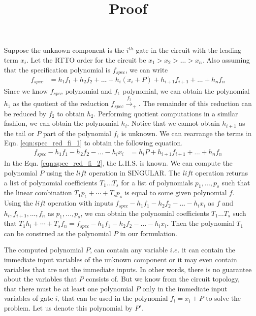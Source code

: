 \documentclass[twocolumn]{IEEEtran}
\theoremstyle{definition}
\begin{document}
\title{Proof} 

\author{}


\thispagestyle{plain}
\pagestyle{plain}

Suppose the unknown component is the $i^{th}$ gate in the circuit with 
the leading term $x_i$. Let the RTTO order for the circuit be $x_1>x_2>\dots>x_n$.
Also assuming that the specification polynomial is $f_{spec}$, we can write
\begin{align}
\label{eqn:spec_red_fi_1}
f_{spec} &= h_1f_1 + h_2f_2 + \dots + h_i(x_i + P) + h_{i+1}f_{i+1} +\dots+ h_nf_n
\end{align}
Since we know $f_{spec}$ polynomial and $f_1$ polynomial, we can obtain the polynomial $h_1$
as the quotient of the reduction $f_{spec} \xrightarrow{f_1}_+$. The remainder of this
reduction can be reduced by $f_2$ to obtain $h_2$. Performing quotient computations in 
a similar fashion, we can obtain the polynomial $h_i$. Notice that we cannot obtain $h_{i+1}$ as the
tail or $P$ part of the polynomial $f_i$ is unknown. We can rearrange the terms in Eqn. \ref{eqn:spec_red_fi_1}
to obtain the following equation.
\begin{align}
\label{eqn:spec_red_fi_2}
f_{spec}-h_1f_1-h_2f_2-\dots-h_ix_i&= h_iP+h_{i+1}f_{i+1} +\dots+ h_nf_n
\end{align}
In the Eqn. \ref{eqn:spec_red_fi_2}, the L.H.S. is known. We can compute the polynomial
$P$ using the $lift$ operation in SINGULAR. The $lift$ operation returns a list of
polynomial coefficients $T_1\dots T_s$ for a list of polynomials $p_1,\dots,p_s$ such that 
the linear combination $T_1p_1+\cdots+T_sp_s$ is equal to some given polynomial $f$.
Using the $lift$ operation with inputs $f_{spec}-h_1f_1-h_2f_2-\dots-h_ix_i$ as $f$
and $h_i,f_{i+1},\dots,f_n$ as $p_1,\dots,p_s$, we can obtain the polynomial coefficients
$T_1\dots T_s$ such that $T_1h_i+\cdots+T_sf_n = f_{spec}-h_1f_1-h_2f_2-\dots-h_ix_i$.
Then the polynomial $T_1$ can be construed as the polynomial $P$ in our formulation.

\par The computed polynomial $P$, can contain any variable $i.e.$ it can contain 
the immediate input variables of the unknown component or it may even contain variables
that are not the immediate inputs. In other words, there is no guarantee about the 
variables that $P$ consists of. But we know from the circuit topology, that there
must be at least one polynomial $P$ only in the immediate input variables of gate $i$, that can 
be used in the polynomial $f_i = x_i+P$ to solve the problem. Let us denote this polynomial by $P'$.
\end{document}
